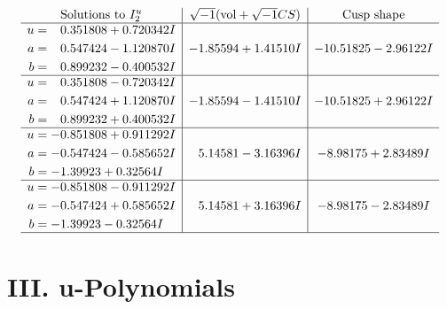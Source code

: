 \documentclass[1p]{elsarticle_modified}
\theoremstyle{definition}
\newcommand{\I}{\sqrt{-1}}
\begin{document}
$$\begin{array}{c|c|c}  
\text{Solutions to }I^u_{2}& \I (\text{vol} + \sqrt{-1}CS) & \text{Cusp shape}\\
 \hline 
\begin{aligned}
u &= \phantom{-}0.351808 + 0.720342 I \\
a &= \phantom{-}0.547424 - 1.120870 I \\
b &= \phantom{-}0.899232 - 0.400532 I\end{aligned}
 & -1.85594 + 1.41510 I & -10.51825 - 2.96122 I \\ \hline\begin{aligned}
u &= \phantom{-}0.351808 - 0.720342 I \\
a &= \phantom{-}0.547424 + 1.120870 I \\
b &= \phantom{-}0.899232 + 0.400532 I\end{aligned}
 & -1.85594 - 1.41510 I & -10.51825 + 2.96122 I \\ \hline\begin{aligned}
u &= -0.851808 + 0.911292 I \\
a &= -0.547424 - 0.585652 I \\
b &= -1.39923 + 0.32564 I\end{aligned}
 & \phantom{-}5.14581 - 3.16396 I & -8.98175 + 2.83489 I \\ \hline\begin{aligned}
u &= -0.851808 - 0.911292 I \\
a &= -0.547424 + 0.585652 I \\
b &= -1.39923 - 0.32564 I\end{aligned}
 & \phantom{-}5.14581 + 3.16396 I & -8.98175 - 2.83489 I\\
 \hline 
 \end{array}$$\newpage
\newpage\renewcommand{\arraystretch}{1}
\centering \section*{ III. u-Polynomials}
\end{document}
